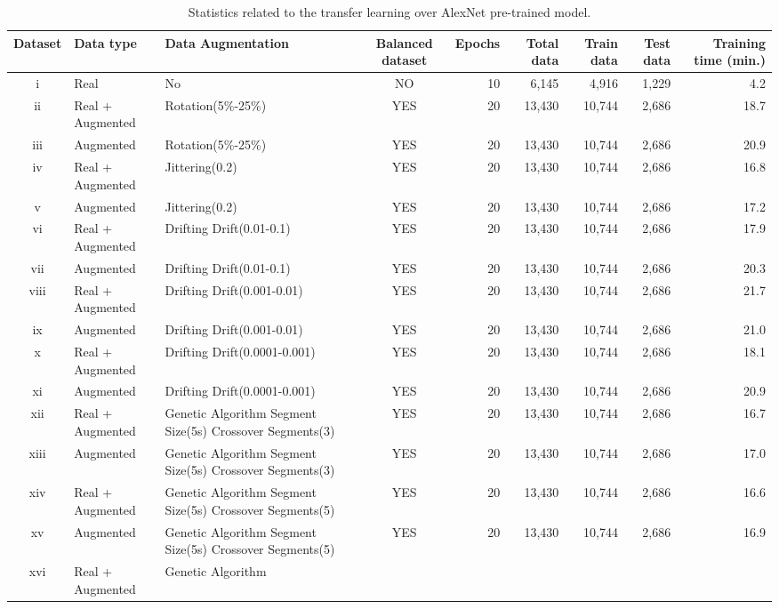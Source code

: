\documentclass[journal]{IEEEtran}
\begin{document}
\begin{table}
\caption{Statistics related to the transfer learning over AlexNet pre-trained model.}
\centering
\begin{adjustbox}{width=\textwidth}
\begin{tabular}{cllcrrrrr}
\hline\hline
Dataset & Data type & Data Augmentation & Balanced dataset & Epochs & Total data & Train data & Test data & Training time (min.) \\
\hline
i & Real & No & NO & 10 & 6,145 & 4,916 & 1,229 & 4.2 \\
ii & Real + Augmented & Rotation(5\%-25\%) & YES & 20 & 13,430 & 10,744 & 2,686 & 18.7 \\
iii & Augmented & Rotation(5\%-25\%) & YES & 20 & 13,430 & 10,744 & 2,686 & 20.9 \\
iv & Real + Augmented & Jittering(0.2) & YES & 20 & 13,430 & 10,744 & 2,686 & 16.8 \\
v & Augmented & Jittering(0.2) & YES & 20 & 13,430 & 10,744 & 2,686 & 17.2 \\
vi & Real + Augmented & Drifting Drift(0.01-0.1) & YES & 20 & 13,430 & 10,744 & 2,686 & 17.9 \\
vii & Augmented & Drifting
  Drift(0.01-0.1) & YES & 20 & 13,430 & 10,744 & 2,686 & 20.3 \\
viii & Real + Augmented & Drifting Drift(0.001-0.01) & YES & 20 & 13,430 & 10,744 & 2,686 & 21.7 \\
ix & Augmented & Drifting
  Drift(0.001-0.01) & YES & 20 & 13,430 & 10,744 & 2,686 & 21.0 \\
x & Real + Augmented & Drifting Drift(0.0001-0.001) & YES & 20 & 13,430 & 10,744 & 2,686 & 18.1 \\
xi & Augmented & Drifting Drift(0.0001-0.001) & YES & 20 & 13,430 & 10,744 & 2,686 & 20.9 \\
xii & Real + Augmented & Genetic Algorithm
  Segment Size(5s) Crossover Segments(3) & YES & 20 & 13,430 & 10,744 & 2,686 & 16.7 \\
xiii & Augmented & Genetic Algorithm Segment Size(5s) Crossover
  Segments(3) & YES & 20 & 13,430 & 10,744 & 2,686 & 17.0 \\
xiv & Real + Augmented & Genetic Algorithm
  Segment Size(5s) Crossover Segments(5) & YES & 20 & 13,430 & 10,744 & 2,686 & 16.6 \\
xv & Augmented & Genetic Algorithm Segment Size(5s) Crossover
  Segments(5) & YES & 20 & 13,430 & 10,744 & 2,686 & 16.9 \\
xvi & Real + Augmented & Genetic Algorithm

\end{tabular}
\end{adjustbox}
\end{table}
\end{document}
